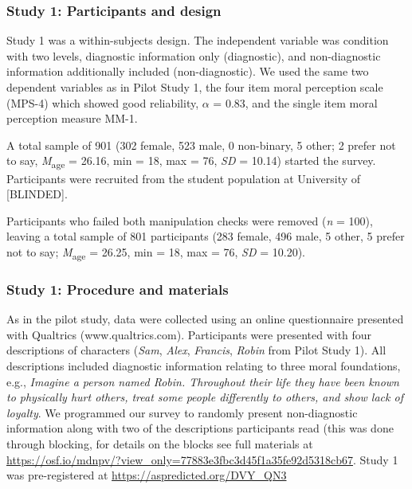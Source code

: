 \documentclass[
  american,
  man,floatsintext]{apa7}
\begin{document}
\hypertarget{study-1-participants-and-design}{%
\subsubsection{Study 1: Participants and design}\label{study-1-participants-and-design}}

Study 1 was a within-subjects design. The independent variable was condition with two levels, diagnostic information only (diagnostic), and non-diagnostic information additionally included (non-diagnostic). We used the same two dependent variables as in Pilot Study 1, the four item moral perception scale (MPS-4) which showed good reliability, \(\alpha\) = 0.83, and the single item moral perception measure MM-1.

A total sample of 901 (302 female, 523 male, 0 non-binary, 5 other; 2 prefer not to say, \emph{M}\textsubscript{age} = 26.16, min = 18, max = 76, \emph{SD} = 10.14) started the survey. Participants were recruited from the student population at University of {[}BLINDED{]}.

Participants who failed both manipulation checks were removed (\emph{n} = 100), leaving a total sample of 801 participants (283 female, 496 male, 5 other, 5 prefer not to say; \emph{M}\textsubscript{age} = 26.25, min = 18, max = 76, \emph{SD} = 10.20).

\hypertarget{study-1-procedure-and-materials}{%
\subsubsection{Study 1: Procedure and materials}\label{study-1-procedure-and-materials}}

As in the pilot study, data were collected using an online questionnaire presented with Qualtrics (www.qualtrics.com). Participants were presented with four descriptions of characters (\emph{Sam}, \emph{Alex}, \emph{Francis}, \emph{Robin} from Pilot Study 1). All descriptions included diagnostic information relating to three moral foundations, e.g., \emph{Imagine a person named Robin. Throughout their life they have been known to physically hurt others, treat some people differently to others, and show lack of loyalty}. We programmed our survey to randomly present non-diagnostic information along with two of the descriptions participants read (this was done through blocking, for details on the blocks see full materials at \color{blue}\url{https://osf.io/mdnpv/?view_only=77883e3fbc3d45f1a35fe92d5318cb67}\color{black}. Study 1 was pre-registered at \color{blue}\url{https://aspredicted.org/DVY_QN3}\color{black}
\end{document}
